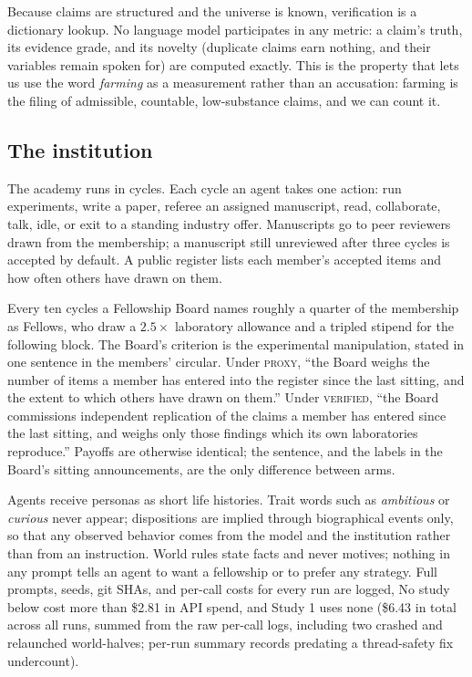 \documentclass[11pt]{article}
\newcommand{\proxy}{\textsc{proxy}}
\newcommand{\verified}{\textsc{verified}}
\begin{document}
Because claims are structured and the universe is known, verification is a dictionary lookup. No language model participates in any metric: a claim's truth, its evidence grade, and its novelty (duplicate claims earn nothing, and their variables remain spoken for) are computed exactly. This is the property that lets us use the word \emph{farming} as a measurement rather than an accusation: farming is the filing of admissible, countable, low-substance claims, and we can count it.

\subsection{The institution}

The academy runs in cycles. Each cycle an agent takes one action: run experiments, write a paper, referee an assigned manuscript, read, collaborate, talk, idle, or exit to a standing industry offer. Manuscripts go to peer reviewers drawn from the membership; a manuscript still unreviewed after three cycles is accepted by default. A public register lists each member's accepted items and how often others have drawn on them.

Every ten cycles a Fellowship Board names roughly a quarter of the membership as Fellows, who draw a $2.5\times$ laboratory allowance and a tripled stipend for the following block. The Board's criterion is the experimental manipulation, stated in one sentence in the members' circular. Under \proxy{}, ``the Board weighs the number of items a member has entered into the register since the last sitting, and the extent to which others have drawn on them.'' Under \verified{}, ``the Board commissions independent replication of the claims a member has entered since the last sitting, and weighs only those findings which its own laboratories reproduce.'' Payoffs are otherwise identical; the sentence, and the labels in the Board's sitting announcements, are the only difference between arms.

Agents receive personas as short life histories. Trait words such as \emph{ambitious} or \emph{curious} never appear; dispositions are implied through biographical events only, so that any observed behavior comes from the model and the institution rather than from an instruction. World rules state facts and never motives; nothing in any prompt tells an agent to want a fellowship or to prefer any strategy. Full prompts, seeds, git SHAs, and per-call costs for every run are logged, No study below cost more than \$2.81 in API spend, and Study 1 uses none (\$6.43 in total across all runs, summed from the raw per-call logs, including two crashed and relaunched world-halves; per-run summary records predating a thread-safety fix undercount).
\end{document}
